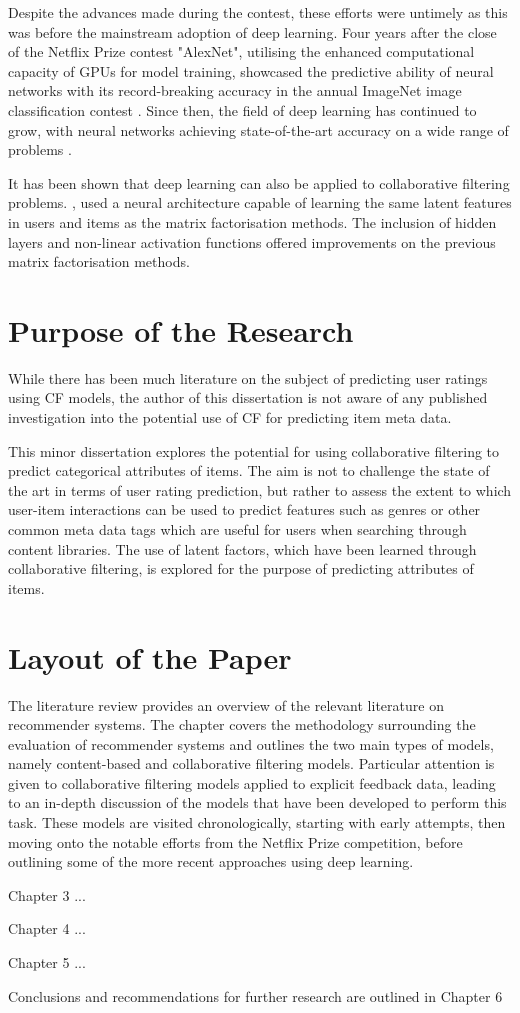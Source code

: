 Despite the advances made during the contest, these efforts were untimely as this was before the mainstream adoption of deep learning. Four years after the close of the Netflix Prize contest "AlexNet", utilising the enhanced computational capacity of GPUs for model training, showcased the predictive ability of neural networks with its record-breaking accuracy in the annual ImageNet image classification contest \parencite{krizhevsky2012imagenet}. Since then, the field of deep learning has continued to grow, with neural networks achieving state-of-the-art accuracy on a wide range of problems \parencite{alom2018history}.

It has been shown that deep learning can also be applied to collaborative filtering problems. \cite{he2017neural}, used a neural architecture capable of learning the same latent features in users and items as the matrix factorisation methods. The inclusion of hidden layers and non-linear activation functions offered improvements on the previous matrix factorisation methods.

\section{Purpose of the Research}
While there has been much literature on the subject of predicting user ratings using CF models, the author of this dissertation is not aware of any published investigation into the potential use of CF for predicting item meta data.

This minor dissertation explores the potential for using collaborative filtering to predict categorical attributes of items. The aim is not to challenge the state of the art in terms of user rating prediction, but rather to assess the extent to which user-item interactions can be used to predict features such as genres or other common meta data tags which are useful for users when searching through content libraries. The use of latent factors, which have been learned through collaborative filtering, is explored for the purpose of predicting attributes of items.

\section{Layout of the Paper}
The literature review provides an overview of the relevant literature on recommender systems. The chapter covers the methodology surrounding the evaluation of recommender systems and outlines the two main types of models, namely content-based and collaborative filtering models. Particular attention is given to collaborative filtering models applied to explicit feedback data, leading to an in-depth discussion of the models that have been developed to perform this task. These models are visited chronologically, starting with early attempts, then moving onto the notable efforts from the Netflix Prize competition, before outlining some of the more recent approaches using deep learning.

Chapter 3 ...

Chapter 4 ...

Chapter 5 ...

Conclusions and recommendations for further research are outlined in Chapter 6


 